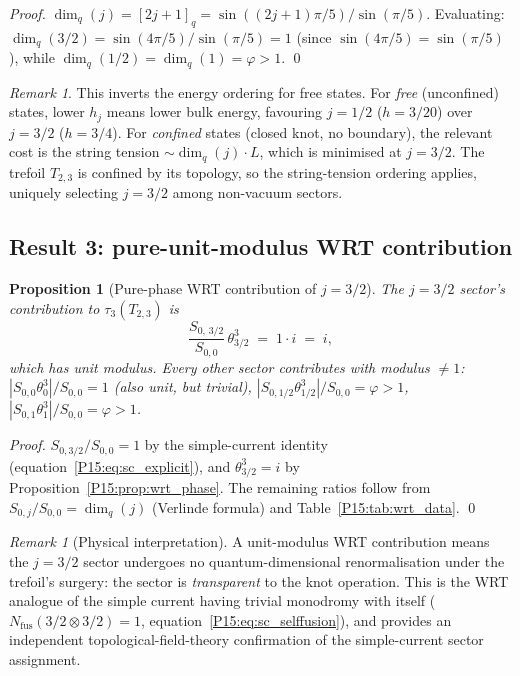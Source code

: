 \documentclass[11pt,a4paper]{article}
\newtheorem{proposition}[theorem]{Proposition}
\theoremstyle{definition}\newtheorem{definition}[theorem]{Definition}
\theoremstyle{remark}
\newtheorem{remark}[theorem]{Remark}
\newcommand{\vp}{\varphi}
\begin{document}
\begin{proof}
$\dim_q(j) = [2j+1]_q = \sin((2j+1)\pi/5)/\sin(\pi/5)$.
Evaluating: $\dim_q(3/2) = \sin(4\pi/5)/\sin(\pi/5) = 1$
(since $\sin(4\pi/5)=\sin(\pi/5)$),
while $\dim_q(1/2) = \dim_q(1) = \vp > 1$.
\qed
\end{proof}

\begin{remark}
\label{P15:rem:inverts_energy_ordering}
This inverts the energy ordering for free states.
For \emph{free} (unconfined) states, lower $h_j$ means lower bulk energy,
favouring $j=1/2$ ($h=3/20$) over $j=3/2$ ($h=3/4$).
For \emph{confined} states (closed knot, no boundary),
the relevant cost is the string tension $\sim\dim_q(j)\cdot L$,
which is minimised at $j=3/2$.
The trefoil $T_{2,3}$ is confined by its topology, so the string-tension
ordering applies, uniquely selecting $j=3/2$ among non-vacuum sectors.
\end{remark}

\subsection{Result 3: pure-unit-modulus WRT contribution}
\label{P15:sec:wrt_pure}

\begin{proposition}[Pure-phase WRT contribution of $j=3/2$]
\label{P15:prop:wrt_pure}
The $j=3/2$ sector's contribution to $\tau_3(T_{2,3})$ is
\begin{equation}
  \frac{S_{0,\,3/2}}{S_{0,0}}\,\theta_{3/2}^3
  \;=\; 1\cdot i \;=\; i,
  \label{P15:eq:wrt_pure}
\end{equation}
which has unit modulus.
Every other sector contributes with modulus $\neq 1$:
$|S_{0,0}\theta_0^3|/S_{0,0}=1$ (also unit, but trivial),
$|S_{0,1/2}\theta_{1/2}^3|/S_{0,0}=\vp>1$,
$|S_{0,1}\theta_1^3|/S_{0,0}=\vp>1$.
\end{proposition}

\begin{proof}
$S_{0,3/2}/S_{0,0}=1$ by the simple-current identity
(equation~\eqref{P15:eq:sc_explicit}),
and $\theta_{3/2}^3=i$ by Proposition~\ref{P15:prop:wrt_phase}.
The remaining ratios follow from $S_{0,j}/S_{0,0}=\dim_q(j)$
(Verlinde formula) and Table~\ref{P15:tab:wrt_data}. \qed
\end{proof}

\begin{remark}[Physical interpretation]
\label{P15:rem:wrt_physical_interp}
A unit-modulus WRT contribution means the $j=3/2$ sector
undergoes no quantum-dimensional renormalisation under the trefoil's
surgery: the sector is \emph{transparent} to the knot operation.
This is the WRT analogue of the simple current having trivial
monodromy with itself ($N_{\mathrm{fus}}(3/2\otimes3/2)=1$,
equation~\eqref{P15:eq:sc_selffusion}), and provides an independent
topological-field-theory confirmation of the simple-current
sector assignment.
\end{remark}
\end{document}
